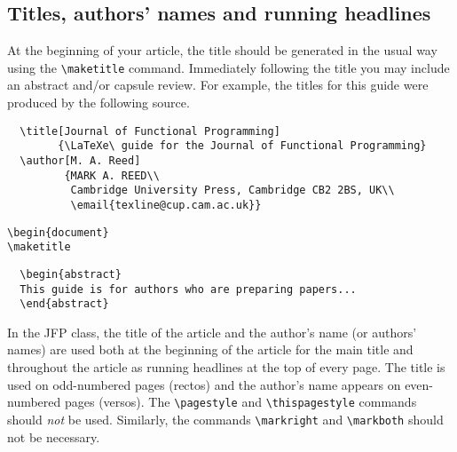 \documentclass{jfp}
\begin{document}
\subsection{Titles, authors' names and running headlines}

At the beginning of your article, the title should be generated in the
usual way using the \verb"\maketitle" command. Immediately following the
title you may include an abstract and/or capsule review. For example, the titles
for this guide were produced by the following source.
%
\begin{verbatim}
  \title[Journal of Functional Programming]
        {\LaTeXe\ guide for the Journal of Functional Programming}
  \author[M. A. Reed]
         {MARK A. REED\\
          Cambridge University Press, Cambridge CB2 2BS, UK\\
          \email{texline@cup.cam.ac.uk}}
\end{verbatim}

\verb"\begin{document}"\\
\indent\verb"\maketitle"

\begin{verbatim}
  \begin{abstract}
  This guide is for authors who are preparing papers...
  \end{abstract}
\end{verbatim}

In the JFP class, the title of the article and the author's name (or
authors' names) are used both at the beginning of the article for the main
title and throughout the article as running headlines at the top of every
page. The title is used on odd-numbered pages (rectos) and the author's name
appears on even-numbered pages (versos). The \verb"\pagestyle" and
\verb"\thispagestyle" commands should \emph{not} be used.  Similarly, the
commands \verb"\markright" and \verb"\markboth" should not be necessary.
\end{document}

